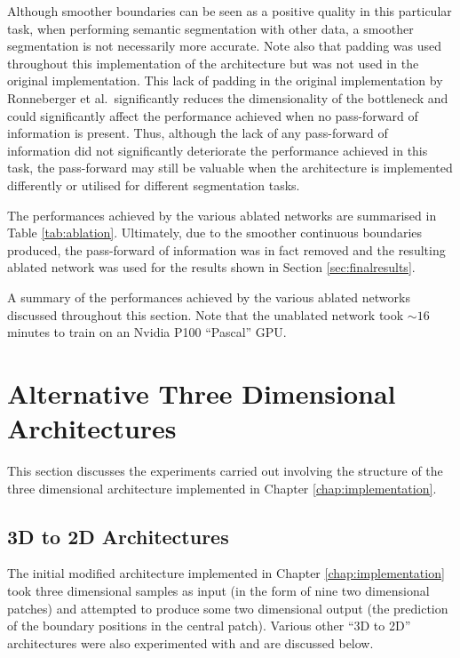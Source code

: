Although smoother boundaries can be seen as a positive quality in this particular task, when performing semantic segmentation with other data, a smoother segmentation is not necessarily more accurate. Note also that padding was used throughout this implementation of the architecture but was not used in the original implementation. This lack of padding in the original implementation by Ronneberger et al.\ significantly reduces the dimensionality of the bottleneck and could significantly affect the performance achieved when no pass-forward of information is present. Thus, although the lack of any pass-forward of information did not significantly deteriorate the performance achieved in this task, the pass-forward may still be valuable when the architecture is implemented differently or utilised for different segmentation tasks.

The performances achieved by the various ablated networks are summarised in Table \ref{tab:ablation}. Ultimately, due to the smoother continuous boundaries produced, the pass-forward of information was in fact removed and the resulting ablated network was used for the results shown in Section \ref{sec:finalresults}.

\begin{table}[!t]
    \centering
    \caption{A summary of the performances achieved by the various ablated networks discussed throughout this section. Note that the unablated network took ${\sim}16$ minutes to train on an Nvidia P100 ``Pascal'' GPU.}
    
    \label{tab:ablation}
\end{table}

\section{Alternative Three Dimensional Architectures}

This section discusses the experiments carried out involving the structure of the three dimensional architecture implemented in Chapter \ref{chap:implementation}.

\subsection{3D to 2D Architectures}

The initial modified architecture implemented in Chapter \ref{chap:implementation} took three dimensional samples as input (in the form of nine two dimensional patches) and attempted to produce some two dimensional output (the prediction of the boundary positions in the central patch). Various other ``3D to 2D'' architectures were also experimented with and are discussed below.

